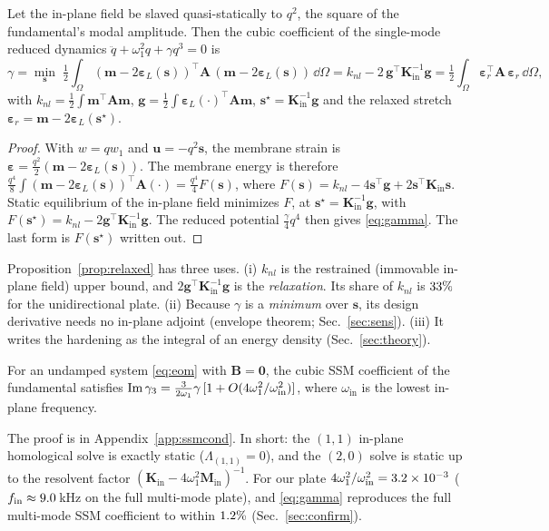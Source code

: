\begin{proposition}\label{prop:relaxed}
Let the in-plane field be slaved quasi-statically to $q^2$, the square of the
fundamental's modal amplitude. Then the cubic coefficient of the single-mode reduced
dynamics $\ddot q+\omega_1^2q+\gamma q^3=0$ is
\begin{equation}
\gamma=\min_{\bm s}\;\tfrac12\int_\Omega(\bm m-2\bm\varepsilon_L(\bm s))^{\!\top}\bm A\,
(\bm m-2\bm\varepsilon_L(\bm s))\,\dd\Omega
=k_{nl}-2\,\bm g^{\!\top}\bm K_{\mathrm{in}}^{-1}\bm g
=\tfrac12\int_\Omega\bm\varepsilon_r^{\!\top}\bm A\,\bm\varepsilon_r\,\dd\Omega,
\label{eq:gamma}
\end{equation}
with $k_{nl}=\tfrac12\int\bm m^{\!\top}\bm A\bm m$,
$\bm g=\tfrac12\int\bm\varepsilon_L(\cdot)^{\!\top}\bm A\bm m$,
$\bm s^\star=\bm K_{\mathrm{in}}^{-1}\bm g$ and the relaxed stretch
$\bm\varepsilon_r=\bm m-2\bm\varepsilon_L(\bm s^\star)$.
\end{proposition}
\begin{proof}
With $w=qw_1$ and $\bm u=-q^2\bm s$, the membrane strain is
$\bm\varepsilon=\tfrac{q^2}{2}(\bm m-2\bm\varepsilon_L(\bm s))$. The membrane energy is
therefore $\tfrac{q^4}{8}\int(\bm m-2\bm\varepsilon_L(\bm s))^{\!\top}\bm A(\cdot)
=\tfrac{q^4}{4}F(\bm s)$, where $F(\bm s)=k_{nl}-4\bm s^{\!\top}\bm g+2\bm s^{\!\top}
\bm K_{\mathrm{in}}\bm s$. Static equilibrium of the in-plane field minimizes $F$, at
$\bm s^\star=\bm K_{\mathrm{in}}^{-1}\bm g$, with $F(\bm s^\star)=k_{nl}-2\bm g^{\!\top}
\bm K_{\mathrm{in}}^{-1}\bm g$. The reduced potential $\tfrac{\gamma}{4}q^4$ then gives
\eqref{eq:gamma}. The last form is $F(\bm s^\star)$ written out.
\end{proof}

Proposition~\ref{prop:relaxed} has three uses. (i) $k_{nl}$ is the restrained
(immovable in-plane field) upper bound, and $2\bm g^{\!\top}\bm K_{\mathrm{in}}^{-1}\bm g$
is the \emph{relaxation}. Its share of $k_{nl}$ is $33\%$ for the unidirectional
plate. (ii) Because $\gamma$ is a \emph{minimum} over $\bm s$, its design derivative
needs no in-plane adjoint (envelope theorem; Sec.~\ref{sec:sens}). (iii) It writes the
hardening as the integral of an energy density (Sec.~\ref{sec:theory}).

\begin{proposition}\label{prop:ssmcond}
For an undamped system \eqref{eq:eom} with $\bm B=\bm 0$, the cubic SSM coefficient of the
fundamental satisfies
$\operatorname{Im}\gamma_3=\tfrac{3}{2\omega_1}\gamma\,[1+O(4\omega_1^2/\omega_{\mathrm{in}}^2)]$,
where $\omega_{\mathrm{in}}$ is the lowest in-plane frequency.
\end{proposition}
\noindent The proof is in Appendix~\ref{app:ssmcond}. In short: the $(1,1)$ in-plane
homological solve is exactly static ($\Lambda_{(1,1)}=0$), and the $(2,0)$ solve is
static up to the resolvent factor
$(\bm K_{\mathrm{in}}-4\omega_1^2\bm M_{\mathrm{in}})^{-1}$. For our plate
$4\omega_1^2/\omega_{\mathrm{in}}^2=3.2\times10^{-3}$ ($f_{\mathrm{in}}\approx9.0$\,kHz on the full multi-mode plate), and \eqref{eq:gamma} reproduces the full
multi-mode SSM coefficient to within $1.2\%$ (Sec.~\ref{sec:confirm}).

